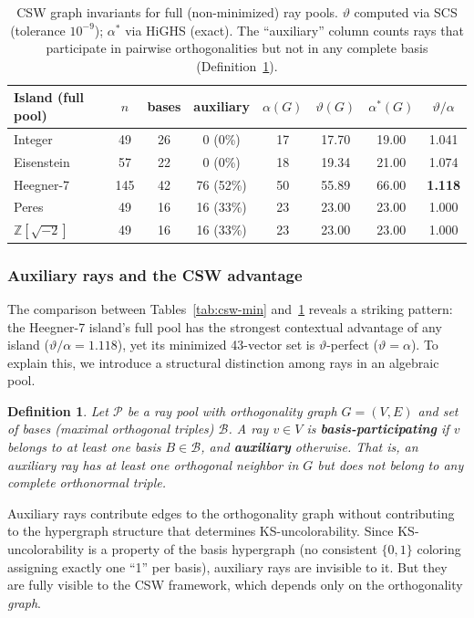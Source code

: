 \documentclass[12pt,a4paper]{article}
\newtheorem{definition}[theorem]{Definition}
\newcommand{\Z}{\mathbb{Z}}
\begin{document}
\begin{table}[ht]
\centering
\caption{CSW graph invariants for full (non-minimized) ray pools. $\vartheta$ computed via SCS (tolerance $10^{-9}$); $\alpha^*$ via HiGHS (exact). The ``auxiliary'' column counts rays that participate in pairwise orthogonalities but not in any complete basis (Definition~\ref{def:auxiliary}).}
\label{tab:csw-pool}
\begin{tabular}{lccccccc}
\toprule
Island (full pool) & $n$ & bases & auxiliary & $\alpha(G)$ & $\vartheta(G)$ & $\alpha^*(G)$ & $\vartheta/\alpha$ \\
\midrule
Integer & 49 & 26 & 0 (0\%) & 17 & 17.70 & 19.00 & 1.041 \\
Eisenstein & 57 & 22 & 0 (0\%) & 18 & 19.34 & 21.00 & 1.074 \\
Heegner-7 & 145 & 42 & 76 (52\%) & 50 & 55.89 & 66.00 & \textbf{1.118} \\
Peres & 49 & 16 & 16 (33\%) & 23 & 23.00 & 23.00 & 1.000 \\
$\Z[\sqrt{-2}]$ & 49 & 16 & 16 (33\%) & 23 & 23.00 & 23.00 & 1.000 \\
\bottomrule
\end{tabular}
\end{table}

\subsubsection{Auxiliary rays and the CSW advantage}

The comparison between Tables~\ref{tab:csw-min} and~\ref{tab:csw-pool} reveals a striking pattern: the Heegner-7 island's full pool has the strongest contextual advantage of any island ($\vartheta/\alpha = 1.118$), yet its minimized 43-vector set is $\vartheta$-perfect ($\vartheta = \alpha$). To explain this, we introduce a structural distinction among rays in an algebraic pool.

\begin{definition}\label{def:auxiliary}
Let $\mathcal{P}$ be a ray pool with orthogonality graph $G = (V, E)$ and set of bases (maximal orthogonal triples) $\mathcal{B}$. A ray $v \in V$ is \textbf{basis-participating} if $v$ belongs to at least one basis $B \in \mathcal{B}$, and \textbf{auxiliary} otherwise. That is, an auxiliary ray has at least one orthogonal neighbor in $G$ but does not belong to any complete orthonormal triple.
\end{definition}

Auxiliary rays contribute edges to the orthogonality graph without contributing to the hypergraph structure that determines KS-uncolorability. Since KS-uncolorability is a property of the basis hypergraph (no consistent $\{0,1\}$ coloring assigning exactly one ``1'' per basis), auxiliary rays are invisible to it. But they are fully visible to the CSW framework, which depends only on the orthogonality \emph{graph}.
\end{document}

